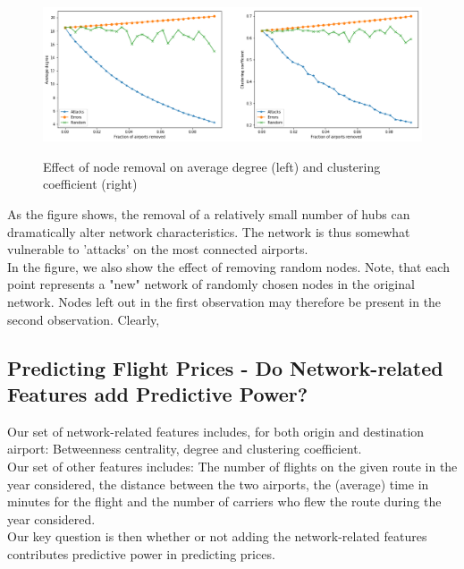 \begin{figure}[H]
  \centering
  \caption{Effect of node removal on average degree (left) and clustering coefficient (right)}
    \includegraphics[width=1. \textwidth]{Exam/Figures/attacksanderrors.png}
  \label{fig:attacks_and_errors}
\end{figure}
As the figure shows, the removal of a relatively small number of hubs can dramatically alter network characteristics. The network is thus somewhat vulnerable to 'attacks' on the most connected airports. \\ In the figure, we also show the effect of removing random nodes. Note, that each point represents a "new" network of randomly chosen nodes in the original network. Nodes left out in the first observation may therefore be present in the second observation. Clearly, 

\subsection{Predicting Flight Prices - Do Network-related Features add Predictive Power?}
Our set of network-related features includes, for both origin and destination airport: Betweenness centrality, degree and clustering coefficient. \\
Our set of other features includes: The number of flights on the given route in the year considered, the distance between the two airports, the (average) time in minutes for the flight and the number of carriers who flew the route during the year considered. \\
Our key question is then whether or not adding the network-related features contributes predictive power in predicting prices. 
